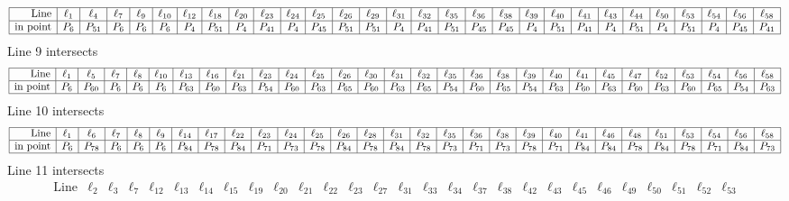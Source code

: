 \documentclass{article}
\begin{document}
{$$\begin{array}{|r*{28}{|c}|}
\hline
\mbox{Line}  & \ell_{1} & \ell_{4} & \ell_{7} & \ell_{9} & \ell_{10} & \ell_{12} & \ell_{18} & \ell_{20} & \ell_{23} & \ell_{24} & \ell_{25} & \ell_{26} & \ell_{29} & \ell_{31} & \ell_{32} & \ell_{35} & \ell_{36} & \ell_{38} & \ell_{39} & \ell_{40} & \ell_{41} & \ell_{43} & \ell_{44} & \ell_{50} & \ell_{53} & \ell_{54} & \ell_{56} & \ell_{58}\\
\hline
\mbox{in point}  & P_{6} & P_{51} & P_{6} & P_{6} & P_{6} & P_{4} & P_{51} & P_{4} & P_{41} & P_{4} & P_{45} & P_{51} & P_{51} & P_{4} & P_{41} & P_{51} & P_{45} & P_{45} & P_{4} & P_{51} & P_{41} & P_{4} & P_{51} & P_{4} & P_{51} & P_{4} & P_{45} & P_{41}\\
\hline
\end{array}
$$
Line 9 intersects 
$$
\begin{array}{|r*{28}{|c}|}
\hline
\mbox{Line}  & \ell_{1} & \ell_{5} & \ell_{7} & \ell_{8} & \ell_{10} & \ell_{13} & \ell_{16} & \ell_{21} & \ell_{23} & \ell_{24} & \ell_{25} & \ell_{26} & \ell_{30} & \ell_{31} & \ell_{32} & \ell_{35} & \ell_{36} & \ell_{38} & \ell_{39} & \ell_{40} & \ell_{41} & \ell_{45} & \ell_{47} & \ell_{52} & \ell_{53} & \ell_{54} & \ell_{56} & \ell_{58}\\
\hline
\mbox{in point}  & P_{6} & P_{60} & P_{6} & P_{6} & P_{6} & P_{63} & P_{60} & P_{63} & P_{54} & P_{60} & P_{63} & P_{65} & P_{60} & P_{63} & P_{65} & P_{54} & P_{60} & P_{65} & P_{54} & P_{63} & P_{60} & P_{63} & P_{60} & P_{63} & P_{60} & P_{65} & P_{54} & P_{63}\\
\hline
\end{array}
$$
Line 10 intersects 
$$
\begin{array}{|r*{28}{|c}|}
\hline
\mbox{Line}  & \ell_{1} & \ell_{6} & \ell_{7} & \ell_{8} & \ell_{9} & \ell_{14} & \ell_{17} & \ell_{22} & \ell_{23} & \ell_{24} & \ell_{25} & \ell_{26} & \ell_{28} & \ell_{31} & \ell_{32} & \ell_{35} & \ell_{36} & \ell_{38} & \ell_{39} & \ell_{40} & \ell_{41} & \ell_{46} & \ell_{48} & \ell_{51} & \ell_{53} & \ell_{54} & \ell_{56} & \ell_{58}\\
\hline
\mbox{in point}  & P_{6} & P_{78} & P_{6} & P_{6} & P_{6} & P_{84} & P_{78} & P_{84} & P_{71} & P_{73} & P_{78} & P_{84} & P_{78} & P_{84} & P_{78} & P_{73} & P_{71} & P_{73} & P_{78} & P_{71} & P_{84} & P_{84} & P_{78} & P_{84} & P_{78} & P_{71} & P_{84} & P_{73}\\
\hline
\end{array}
$$
Line 11 intersects 
$$
\begin{array}{|r*{27}{|c}|}
\hline
\mbox{Line}  & \ell_{2} & \ell_{3} & \ell_{7} & \ell_{12} & \ell_{13} & \ell_{14} & \ell_{15} & \ell_{19} & \ell_{20} & \ell_{21} & \ell_{22} & \ell_{23} & \ell_{27} & \ell_{31} & \ell_{33} & \ell_{34} & \ell_{37} & \ell_{38} & \ell_{42} & \ell_{43} & \ell_{45} & \ell_{46} & \ell_{49} & \ell_{50} & \ell_{51} & \ell_{52} & \ell_{53}\\

\end{array}$$}
\end{document}
